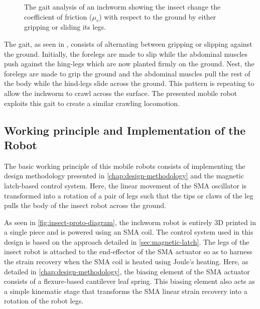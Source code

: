 \begin{figure}[ht!] %
  \centering
  \def\svgwidth{\textwidth}
  \resizebox{\textwidth}{!}{}
  \caption{The gait analysis of an inchworm showing the insect change the coefficient of friction ($\mu_s$) with respect to the ground by either gripping or sliding its legs.}
  \label{fig:real-inchworm-diagram}
\end{figure}

The gait, as seen in \todocite, consists of alternating between gripping or slipping against the ground. Initially, the forelegs are made to slip while the abdominal muscles push against the hing-legs which are now planted firmly on the ground. Nest, the forelegs are made to grip the ground and the abdominal muscles pull the rest of the body while the hind-legs slide across the ground. This pattern is repeating to allow the inchworm to crawl across the surface. The presented mobile robot exploits this gait to create a similar crawling locomotion.

\subsection{Working principle and Implementation of the Robot}

The basic working principle of this mobile robots consists of implementing the design methodology presented in \cref{chap:design-methodology} and the magnetic latch-based control system. Here, the linear movement of the SMA oscillator is transformed into a rotation of a pair of legs such that the tips or claws of the leg pulls the body of the insect robot across the ground.

As seen in \cref{fig:insect-proto-diagram}, the inchworm robot is entirely 3D printed in a single piece and is powered using an SMA coil. The control system used in this design is based on the approach detailed in \cref{sec:magnetic-latch}. The legs of the insect robot is attached to the end-effector of the SMA actuator so as to harness the strain recovery when the SMA coil is heated using Joule's heating. Here, as detailed in \cref{chap:design-methodology}, the biasing element of the SMA actuator consists of a flexure-based cantilever leaf spring. This biasing element also acts as a simple kinematic stage that transforms the SMA linear strain recovery into a rotation of the robot legs.

